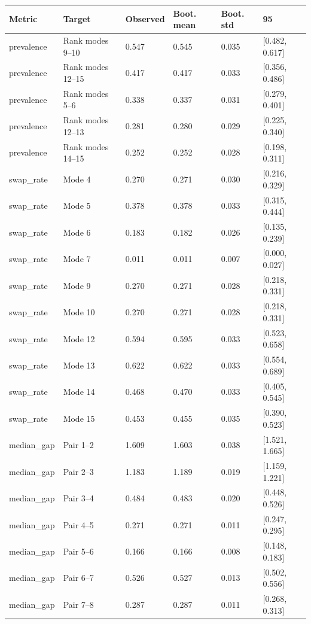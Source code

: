 \begin{tabular}{llllll}
\toprule
Metric & Target & Observed & Boot. mean & Boot. std & 95\\%
\midrule
prevalence & Rank modes 9--10 & 0.547 & 0.545 & 0.035 & [0.482, 0.617] \\
prevalence & Rank modes 12--15 & 0.417 & 0.417 & 0.033 & [0.356, 0.486] \\
prevalence & Rank modes 5--6 & 0.338 & 0.337 & 0.031 & [0.279, 0.401] \\
prevalence & Rank modes 12--13 & 0.281 & 0.280 & 0.029 & [0.225, 0.340] \\
prevalence & Rank modes 14--15 & 0.252 & 0.252 & 0.028 & [0.198, 0.311] \\
swap\_rate & Mode 4 & 0.270 & 0.271 & 0.030 & [0.216, 0.329] \\
swap\_rate & Mode 5 & 0.378 & 0.378 & 0.033 & [0.315, 0.444] \\
swap\_rate & Mode 6 & 0.183 & 0.182 & 0.026 & [0.135, 0.239] \\
swap\_rate & Mode 7 & 0.011 & 0.011 & 0.007 & [0.000, 0.027] \\
swap\_rate & Mode 9 & 0.270 & 0.271 & 0.028 & [0.218, 0.331] \\
swap\_rate & Mode 10 & 0.270 & 0.271 & 0.028 & [0.218, 0.331] \\
swap\_rate & Mode 12 & 0.594 & 0.595 & 0.033 & [0.523, 0.658] \\
swap\_rate & Mode 13 & 0.622 & 0.622 & 0.033 & [0.554, 0.689] \\
swap\_rate & Mode 14 & 0.468 & 0.470 & 0.033 & [0.405, 0.545] \\
swap\_rate & Mode 15 & 0.453 & 0.455 & 0.035 & [0.390, 0.523] \\
median\_gap & Pair 1--2 & 1.609 & 1.603 & 0.038 & [1.521, 1.665] \\
median\_gap & Pair 2--3 & 1.183 & 1.189 & 0.019 & [1.159, 1.221] \\
median\_gap & Pair 3--4 & 0.484 & 0.483 & 0.020 & [0.448, 0.526] \\
median\_gap & Pair 4--5 & 0.271 & 0.271 & 0.011 & [0.247, 0.295] \\
median\_gap & Pair 5--6 & 0.166 & 0.166 & 0.008 & [0.148, 0.183] \\
median\_gap & Pair 6--7 & 0.526 & 0.527 & 0.013 & [0.502, 0.556] \\
median\_gap & Pair 7--8 & 0.287 & 0.287 & 0.011 & [0.268, 0.313] \\

\end{tabular}
